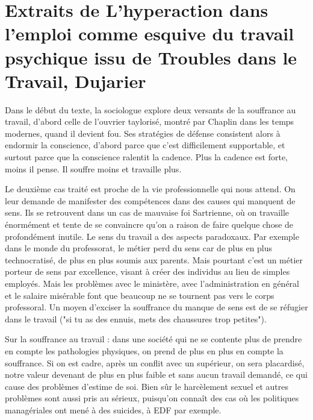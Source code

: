 \documentclass[a4paper,12pt]{book}
\begin{document}
\section{Extraits de L'hyperaction dans l'emploi comme esquive du travail psychique issu de Troubles dans le Travail, Dujarier}
Dans le début du texte, la sociologue explore deux versants de la souffrance au travail, d'abord celle de l'ouvrier taylorisé, montré par Chaplin dans les temps modernes, quand il devient fou. Ses stratégies de défense consistent alors à endormir la conscience, d'abord parce que c'est difficilement supportable, et surtout parce que la conscience ralentit la cadence. Plus la cadence est forte, moins il pense. Il souffre moins et travaille plus.
\par Le deuxième cas traité est proche de la vie professionnelle qui nous attend. On leur demande de manifester des compétences dans des causes qui manquent de sens. Ils se retrouvent dans un cas de mauvaise foi Sartrienne, où on travaille énormément et tente de se convaincre qu'on a raison de faire quelque chose de profondément inutile. Le sens du travail a des aspects paradoxaux. Par exemple dans le monde du professorat, le métier perd du sens car de plus en plus technocratisé, de plus en plus soumis aux parents. Mais pourtant c'est un métier porteur de sens par excellence, visant à créer des individus au lieu de simples employés. Mais les problèmes avec le ministère, avec l'administration en général et le salaire misérable font que beaucoup ne se tournent pas vers le corps professoral. Un moyen d'exciser la souffrance du manque de sens est de se réfugier dans le travail ("si tu as des ennuis, mets des chaussures trop petites").
\par Sur la souffrance au travail : dans une société qui ne se contente plus de prendre en compte les pathologies physiques, on prend de plus en plus en compte la souffrance. Si on est cadre, après un conflit avec un supérieur, on sera placardisé, notre valeur devenant de plus en plus faible et sans aucun travail demandé, ce qui cause des problèmes d'estime de soi. Bien sûr le harcèlement sexuel et autres problèmes sont aussi pris au sérieux, puisqu'on connaît des cas où les politiques managériales ont mené à des suicides, à EDF par exemple.
\end{document}
